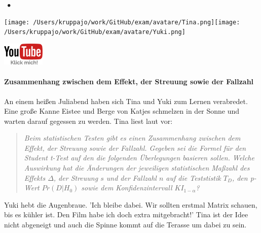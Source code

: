 \documentclass[a4paper, 9pt]{scrartcl}\usepackage[]{graphicx}\usepackage[]{xcolor}
\begin{document}
 
\ifcollection
\begin{flushright}
\tiny\vspace{-3Ex}
\textbf{\examinhaltstart}
\exammodulestatversuch $\;\bullet$
\exammodulebiostat
\vspace{-4Ex}
\end{flushright}
\begin{minipage}[t]{0.5\textwidth}
\texttt{[image: /Users/kruppajo/work/GitHub/exam/avatare/Tina.png]}\hspace{-4mm}\texttt{[image: /Users/kruppajo/work/GitHub/exam/avatare/Yuki.png]}
\end{minipage}
\begin{minipage}[t]{0.5\textwidth}
\hfill
\href{https://youtu.be/FgZmpnEWDag}{\includegraphics[width = 2cm]{img/youtube}}
\end{minipage}
\fi



\ifcollection
\paragraph{Zusammenhang zwischen dem Effekt, der Streuung sowie der Fallzahl}
\fi

An einem heißen Juliabend haben sich Tina und Yuki zum Lernen verabredet. Eine große Kanne Eistee und Berge von Katjes schmelzen in der Sonne  und warten darauf gegessen zu werden. Tina liest laut vor:\begin{quote}
                 \textit{
                 Beim statistischen Testen gibt es einen Zusammenhang zwischen dem Effekt, der Streuung sowie der Fallzahl. Gegeben sei die Formel für den Student t-Test auf den die folgenden Überlegungen basieren sollen. Welche Auswirkung hat die Änderungen der jeweiligen statistischen Maßzahl des Effekts $\Delta$, der Streuung $s$ und der Fallzahl $n$ auf die Teststistik $T_{D}$, den p-Wert $Pr(D|H_0)$ sowie dem Konfidenzintervall $KI_{1-\alpha}$?
                 }
                 \end{quote}Yuki hebt die Augenbraue. 'Ich bleibe dabei. Wir sollten erstmal Matrix schauen, bis es kühler ist. Den Film habe ich doch extra mitgebracht!' Tina ist der Idee nicht abgeneigt und auch die Spinne kommt auf die Terasse um dabei zu sein.
\end{document}
